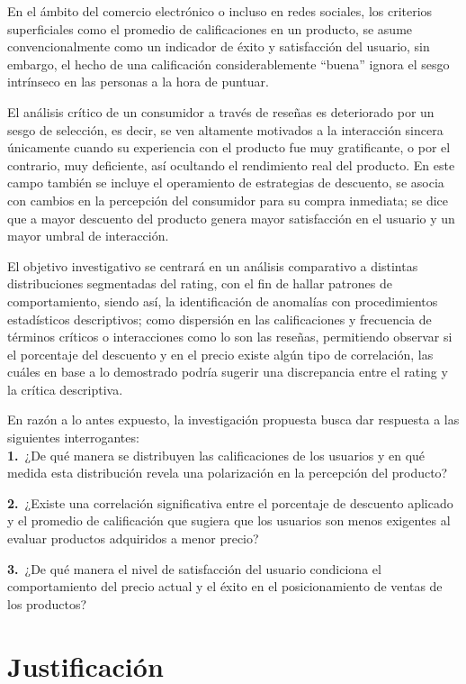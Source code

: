 \documentclass[oneside,11pt]{Latex/Classes/PhDthesisPSnPDF}
\begin{document}
En el ámbito del comercio electrónico o incluso en redes sociales, los
criterios superficiales como el promedio de calificaciones en un
producto, se asume convencionalmente como un indicador de éxito y
satisfacción del usuario, sin embargo, el hecho de una calificación
considerablemente ``buena'' ignora el sesgo intrínseco en las personas a
la hora de puntuar.

El análisis crítico de un consumidor a través de reseñas es deteriorado
por un sesgo de selección, es decir, se ven altamente motivados a la
interacción sincera únicamente cuando su experiencia con el producto fue
muy gratificante, o por el contrario, muy deficiente, así ocultando el
rendimiento real del producto. En este campo también se incluye el
operamiento de estrategias de descuento, se asocia con cambios en la
percepción del consumidor para su compra inmediata; se dice que a mayor
descuento del producto genera mayor satisfacción en el usuario y un
mayor umbral de interacción.

El objetivo investigativo se centrará en un análisis comparativo a
distintas distribuciones segmentadas del rating, con el fin de hallar
patrones de comportamiento, siendo así, la identificación de anomalías
con procedimientos estadísticos descriptivos; como dispersión en las
calificaciones y frecuencia de términos críticos o interacciones como lo
son las reseñas, permitiendo observar si el porcentaje del descuento y
en el precio existe algún tipo de correlación, las cuáles en base a lo
demostrado podría sugerir una discrepancia entre el rating y la crítica
descriptiva.

En razón a lo antes expuesto, la investigación propuesta busca dar
respuesta a las siguientes interrogantes:\\

\textbf{1.}~¿De qué manera se distribuyen las calificaciones de los
usuarios y en qué medida esta distribución revela una polarización en la
percepción del producto?

\textbf{2.}~¿Existe una correlación significativa entre el porcentaje de
descuento aplicado y el promedio de calificación que sugiera que los
usuarios son menos exigentes al evaluar productos adquiridos a menor
precio?

\textbf{3.}~¿De qué manera el nivel de satisfacción del usuario
condiciona el comportamiento del precio actual y el éxito en el
posicionamiento de ventas de los productos?

\section{Justificación}
\end{document}
